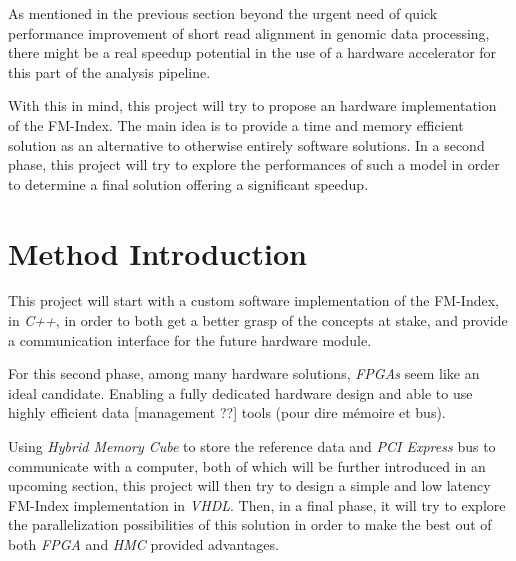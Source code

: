 As mentioned in the previous section beyond the urgent need of quick performance improvement of short read alignment in genomic data processing, there might be a real speedup potential in the use of a hardware accelerator for this part of the analysis pipeline. 

With this in mind, this project will try to propose an hardware implementation of the FM-Index. The main idea is to provide a time and memory efficient solution as an alternative to otherwise entirely software solutions. In a second phase, this project will try to explore the performances of such a model in order to determine a final solution offering a significant speedup.

\section{Method Introduction}

This project will start with a custom software implementation of the FM-Index, in \textsl{C++}, in order to both get a better grasp of the concepts at stake, and provide a communication interface for the future hardware module.

 For this second phase, among many hardware solutions, \textsl{FPGAs} seem like an ideal candidate. Enabling a fully dedicated hardware design and able to use  highly efficient data [management ??] tools (pour dire mémoire et bus).

Using \textsl{Hybrid Memory Cube} to store the reference data and \textsl{PCI Express} bus to communicate with a computer, both of which will be further introduced in an upcoming section, this project will then try to design a simple and low latency FM-Index implementation in \textsl{VHDL}. Then, in a final phase, it will try to explore the parallelization possibilities of this solution in order to make the best out of both \textsl{FPGA} and \textsl{HMC} provided advantages.